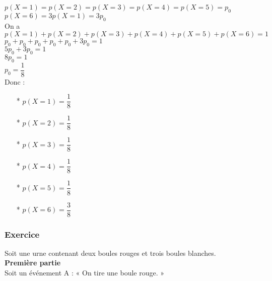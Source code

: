 $p\left(X=1\right) = p\left(X=2\right) = p\left(X=3\right) = p\left(X=4\right) = p\left(X=5\right) = p_0 $ \\

$p\left(X=6\right) = 3p\left(X=1\right) = 3p_0 $ \\

On a $p\left(X=1\right) + p\left(X=2\right) + p\left(X=3\right) + p\left(X=4\right) + p\left(X=5\right) + p\left(X=6\right) = 1$ \\

$ p_0 + p_0 + p_0 + p_0 + p_0 + 3p_0 = 1 $ \\

$ 5p_0 + 3p_0 = 1 $ \\

$ 8p_0 = 1 $ \\

 $p_0 = \dfrac{1}{8} $ \\
 
Donc :

\begin{itemize}
\item[*] $p\left(X=1\right) = \dfrac{1}{8} $ \\
\item[*] $p\left(X=2\right) = \dfrac{1}{8} $ \\
\item[*] $p\left(X=3\right) = \dfrac{1}{8} $ \\
\item[*] $p\left(X=4\right) = \dfrac{1}{8} $ \\
\item[*] $p\left(X=5\right) = \dfrac{1}{8} $ \\
\item[*] $p\left(X=6\right) = \dfrac{3}{8} $ \\
\end{itemize}

\newpage

\subsubsection{Exercice }

Soit une urne contenant deux boules rouges et trois boules blanches. \\

\textbf{Première partie} \\

Soit un événement A : « On tire une boule rouge. » \\

